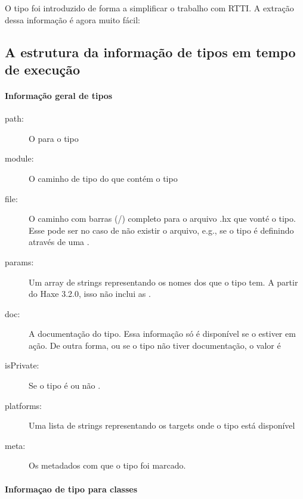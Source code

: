 
O tipo  foi introduzido de forma a simplificar o trabalho com RTTI. A extração dessa informação é agora muito fácil:


\subsection{A estrutura da informação de tipos em tempo de execução}
\label{cr-rtti-structure}

\paragraph{Informação geral de tipos}

\begin{description}
    \item[path:] O  para o tipo
    \item[module:] O caminho de tipo do que contém o tipo
    \item[file:] O caminho com barras (\slash) completo para o arquivo .hx que vonté o tipo. Esse pode ser  no caso de não existir o arquivo, e.g., se o tipo é definindo através de uma .
    \item[params:] Um array de strings representando os nomes dos  que o tipo tem. A partir do Haxe 3.2.0, isso não inclui as .
    \item[ doc:] A documentação do tipo. Essa informação só é disponível se o   estiver em ação. De outra forma, ou se o tipo não tiver documentação, o valor é 
    \item[isPrivate:] Se o tipo é ou não .
    \item[platforms:] Uma lista de strings representando os targets onde o tipo está disponível
     \item[meta:] Os metadados com que o tipo foi marcado.
\end{description}
  
\paragraph{Informaçao de tipo para classes}
\label{cr-rtti-class-type-information}

